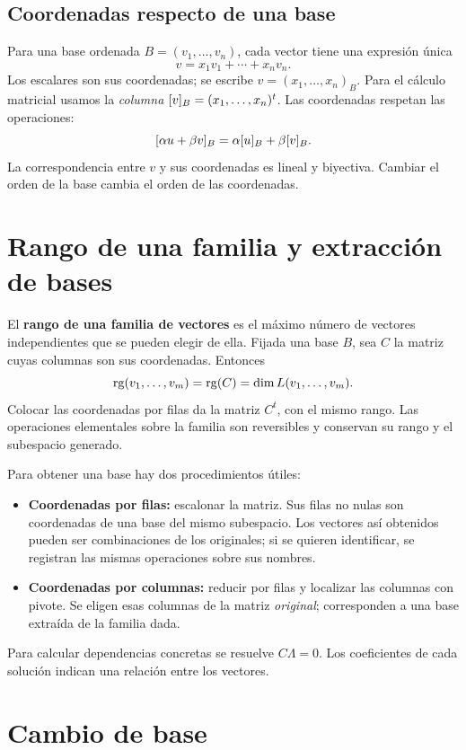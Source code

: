 \subsection*{Coordenadas respecto de una base}

Para una base ordenada $B=(v_1,\ldots,v_n)$, cada vector tiene una
expresión única
\[
 v=x_1v_1+\cdots+x_nv_n.
\]
Los escalares son sus coordenadas; se escribe $v=(x_1,\ldots,x_n)_B$.
Para el cálculo matricial usamos la \emph{columna}
$[v]_{B}=(x_1,\ldots,x_n)^t$.
Las coordenadas respetan las operaciones:
\[
 [\alpha u+\beta v]_{B}
 =\alpha[u]_{B}+\beta[v]_{B}.
\]
La correspondencia entre $v$ y sus coordenadas es lineal y biyectiva.
Cambiar el orden de la base cambia el orden de las coordenadas.

\section{Rango de una familia y extracción de bases}
\label{sec:rango-vectores}

El \textbf{rango de una familia de vectores} es el máximo número de
vectores independientes que se pueden elegir de ella. Fijada una base $B$,
sea $C$ la matriz cuyas columnas son sus coordenadas. Entonces
\[
 \operatorname{rg}(v_1,\ldots,v_m)=\operatorname{rg}(C)=\dim L(v_1,\ldots,v_m).
\]
Colocar las coordenadas por filas da la matriz $C^t$, con el mismo rango.
Las operaciones elementales sobre la familia son reversibles y conservan
su rango y el subespacio generado.

Para obtener una base hay dos procedimientos útiles:
\begin{itemize}
 \item \textbf{Coordenadas por filas:} escalonar la matriz. Sus filas no nulas
       son coordenadas de una base del mismo subespacio. Los vectores así
       obtenidos pueden ser combinaciones de los originales; si se quieren
       identificar, se registran las mismas operaciones sobre sus nombres.
 \item \textbf{Coordenadas por columnas:} reducir por filas y localizar las
       columnas con pivote. Se eligen esas columnas de la matriz
       \emph{original}; corresponden a una base extraída de la familia dada.
\end{itemize}
Para calcular dependencias concretas se resuelve $C\Lambda=0$.
Los coeficientes de cada solución indican una relación entre los vectores.

\section{Cambio de base}
\label{sec:cambio-base}

